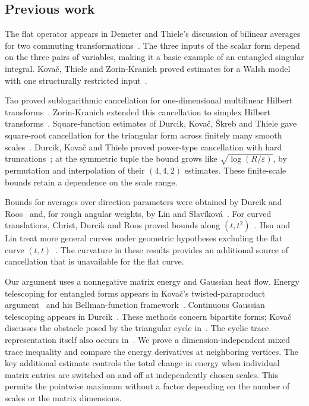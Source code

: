 \subsection{Previous work}

The flat operator appears in Demeter and Thiele's discussion of
bilinear averages for two commuting transformations~\cite[Section~6]{DemeterThiele2010}.
The three inputs of the scalar form depend on the three pairs of
variables, making it a basic example of an entangled singular integral.
Kova\v{c}, Thiele and Zorin-Kranich proved estimates for a Walsh model
with one structurally restricted input~\cite[Theorem~1.7]{KovacThieleZorinKranich2015}.

Tao proved sublogarithmic cancellation for one-dimensional multilinear
Hilbert transforms~\cite[Theorem~1.2]{Tao2016Cancellation}.
Zorin-Kranich extended this cancellation to simplex Hilbert
transforms~\cite[Theorem~1.3]{ZorinKranich2017}. Square-function estimates of Durcik,
Kova\v{c}, \v{S}kreb and Thiele gave square-root cancellation for the
triangular form across finitely many smooth scales~\cite[Corollary~5]{DurcikKovacSkrebThiele2019}.
Durcik, Kova\v{c} and Thiele proved power-type cancellation with hard
truncations~\cite[Theorem~1]{DurcikKovacThiele2019}; at the symmetric
tuple the bound grows like $\sqrt{\log(R/\varepsilon)}$, by permutation
and interpolation of their $(4,4,2)$ estimates.
These finite-scale bounds retain a dependence on the scale range.

Bounds for averages over direction parameters were obtained by
Durcik and Roos~\cite[Theorem~1]{DurcikRoos2021} and, for rough angular
weights, by Lin and Slav\'ikov\'a~\cite[Theorem~1.1]{LinSlavikova2026}.
For curved translations, Christ, Durcik and Roos proved bounds along
$(t,t^2)$~\cite[Theorem~1]{ChristDurcikRoos2021}. Hsu and Lin treat
more general curves under geometric hypotheses excluding the flat curve
$(t,t)$~\cite[Theorem~1.37]{HsuLin2026}. The curvature in these results
provides an additional source of cancellation that is unavailable for
the flat curve.

Our argument uses a nonnegative matrix energy and Gaussian heat flow.
Energy telescoping for entangled forms appears in Kova\v{c}'s
twisted-paraproduct argument~\cite[Lemma~2]{Kovac2012Twisted} and his
Bellman-function framework~\cite[Section~2]{Kovac2011}. Continuous
Gaussian telescoping appears in Durcik~\cite[Lemma~3 and Section~3]{Durcik2015}.
These methods concern bipartite forms; Kova\v{c} discusses the obstacle
posed by the triangular cycle in~\cite[Section~6.2]{Kovac2011}.
The cyclic trace representation itself also occurs
in~\cite[Equation~(1.5)]{KovacThieleZorinKranich2015}.
We prove a dimension-independent mixed trace inequality and compare
the energy derivatives at neighboring vertices. The key additional
estimate controls the total change in energy when individual matrix
entries are switched on and off at independently chosen scales.
This permits the pointwise maximum without a factor depending on
the number of scales or the matrix dimensions.

